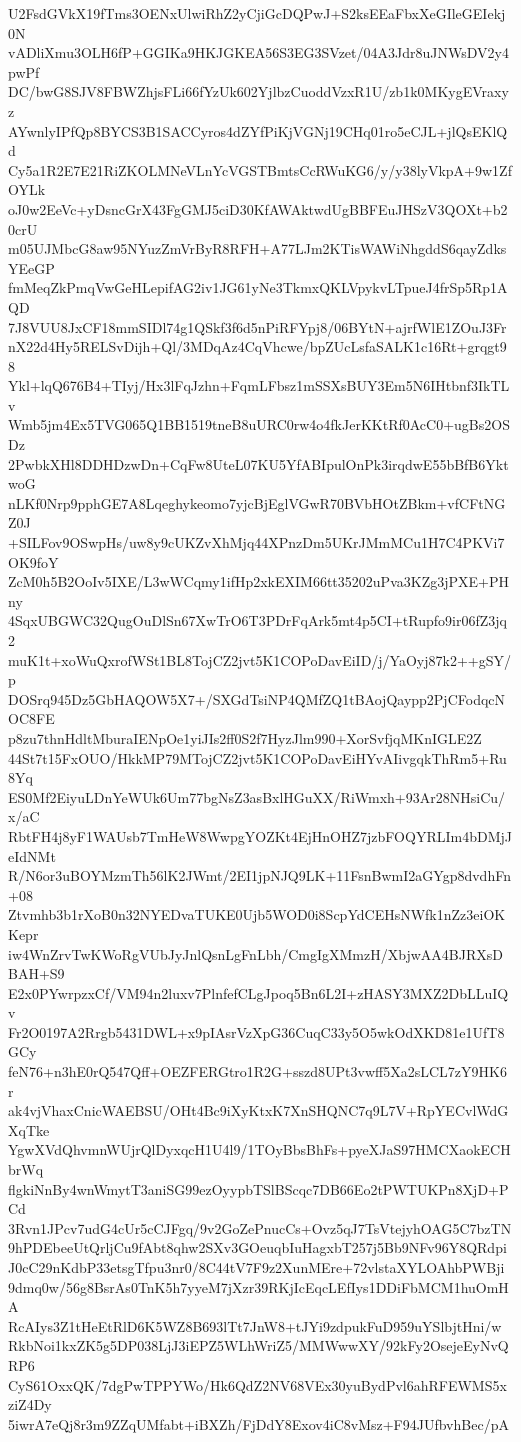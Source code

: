 U2FsdGVkX19fTms3OENxUlwiRhZ2yCjiGcDQPwJ+S2ksEEaFbxXeGIleGEIekj0N
vADliXmu3OLH6fP+GGIKa9HKJGKEA56S3EG3SVzet/04A3Jdr8uJNWsDV2y4pwPf
DC/bwG8SJV8FBWZhjsFLi66fYzUk602YjlbzCuoddVzxR1U/zb1k0MKygEVraxyz
AYwnlyIPfQp8BYCS3B1SACCyros4dZYfPiKjVGNj19CHq01ro5eCJL+jlQsEKlQd
Cy5a1R2E7E21RiZKOLMNeVLnYcVGSTBmtsCcRWuKG6/y/y38lyVkpA+9w1ZfOYLk
oJ0w2EeVc+yDsncGrX43FgGMJ5ciD30KfAWAktwdUgBBFEuJHSzV3QOXt+b20crU
m05UJMbcG8aw95NYuzZmVrByR8RFH+A77LJm2KTisWAWiNhgddS6qayZdksYEeGP
fmMeqZkPmqVwGeHLepifAG2iv1JG61yNe3TkmxQKLVpykvLTpueJ4frSp5Rp1AQD
7J8VUU8JxCF18mmSIDl74g1QSkf3f6d5nPiRFYpj8/06BYtN+ajrfWlE1ZOuJ3Fr
nX22d4Hy5RELSvDijh+Ql/3MDqAz4CqVhcwe/bpZUcLsfaSALK1c16Rt+grqgt98
Ykl+lqQ676B4+TIyj/Hx3lFqJzhn+FqmLFbsz1mSSXsBUY3Em5N6IHtbnf3IkTLv
Wmb5jm4Ex5TVG065Q1BB1519tneB8uURC0rw4o4fkJerKKtRf0AcC0+ugBs2OSDz
2PwbkXHl8DDHDzwDn+CqFw8UteL07KU5YfABIpulOnPk3irqdwE55bBfB6YktwoG
nLKf0Nrp9pphGE7A8Lqeghykeomo7yjcBjEglVGwR70BVbHOtZBkm+vfCFtNGZ0J
+SILFov9OSwpHs/uw8y9cUKZvXhMjq44XPnzDm5UKrJMmMCu1H7C4PKVi7OK9foY
ZcM0h5B2OoIv5IXE/L3wWCqmy1ifHp2xkEXIM66tt35202uPva3KZg3jPXE+PHny
4SqxUBGWC32QugOuDlSn67XwTrO6T3PDrFqArk5mt4p5CI+tRupfo9ir06fZ3jq2
muK1t+xoWuQxrofWSt1BL8TojCZ2jvt5K1COPoDavEiID/j/YaOyj87k2++gSY/p
DOSrq945Dz5GbHAQOW5X7+/SXGdTsiNP4QMfZQ1tBAojQaypp2PjCFodqcNOC8FE
p8zu7thnHdltMburaIENpOe1yiJIs2ff0S2f7HyzJlm990+XorSvfjqMKnIGLE2Z
44St7t15FxOUO/HkkMP79MTojCZ2jvt5K1COPoDavEiHYvAIivgqkThRm5+Ru8Yq
ES0Mf2EiyuLDnYeWUk6Um77bgNsZ3asBxlHGuXX/RiWmxh+93Ar28NHsiCu/x/aC
RbtFH4j8yF1WAUsb7TmHeW8WwpgYOZKt4EjHnOHZ7jzbFOQYRLIm4bDMjJeIdNMt
R/N6or3uBOYMzmTh56lK2JWmt/2EI1jpNJQ9LK+11FsnBwmI2aGYgp8dvdhFn+08
Ztvmhb3b1rXoB0n32NYEDvaTUKE0Ujb5WOD0i8ScpYdCEHsNWfk1nZz3eiOKKepr
iw4WnZrvTwKWoRgVUbJyJnlQsnLgFnLbh/CmgIgXMmzH/XbjwAA4BJRXsDBAH+S9
E2x0PYwrpzxCf/VM94n2luxv7PlnfefCLgJpoq5Bn6L2I+zHASY3MXZ2DbLLuIQv
Fr2O0197A2Rrgb5431DWL+x9pIAsrVzXpG36CuqC33y5O5wkOdXKD81e1UfT8GCy
feN76+n3hE0rQ547Qff+OEZFERGtro1R2G+sszd8UPt3vwff5Xa2sLCL7zY9HK6r
ak4vjVhaxCnicWAEBSU/OHt4Bc9iXyKtxK7XnSHQNC7q9L7V+RpYECvlWdGXqTke
YgwXVdQhvmnWUjrQlDyxqcH1U4l9/1TOyBbsBhFs+pyeXJaS97HMCXaokECHbrWq
flgkiNnBy4wnWmytT3aniSG99ezOyypbTSlBScqc7DB66Eo2tPWTUKPn8XjD+PCd
3Rvn1JPcv7udG4cUr5cCJFgq/9v2GoZePnucCs+Ovz5qJ7TsVtejyhOAG5C7bzTN
9hPDEbeeUtQrljCu9fAbt8qhw2SXv3GOeuqbIuHagxbT257j5Bb9NFv96Y8QRdpi
J0cC29nKdbP33etsgTfpu3nr0/8C44tV7F9z2XunMEre+72vlstaXYLOAhbPWBji
9dmq0w/56g8BsrAs0TnK5h7yyeM7jXzr39RKjIcEqcLEfIys1DDiFbMCM1huOmHA
RcAIys3Z1tHeEtRlD6K5WZ8B693lTt7JnW8+tJYi9zdpukFuD959uYSlbjtHni/w
RkbNoi1kxZK5g5DP038LjJ3iEPZ5WLhWriZ5/MMWwwXY/92kFy2OsejeEyNvQRP6
CyS61OxxQK/7dgPwTPPYWo/Hk6QdZ2NV68VEx30yuBydPvl6ahRFEWMS5xziZ4Dy
5iwrA7eQj8r3m9ZZqUMfabt+iBXZh/FjDdY8Exov4iC8vMsz+F94JUfbvhBec/pA
